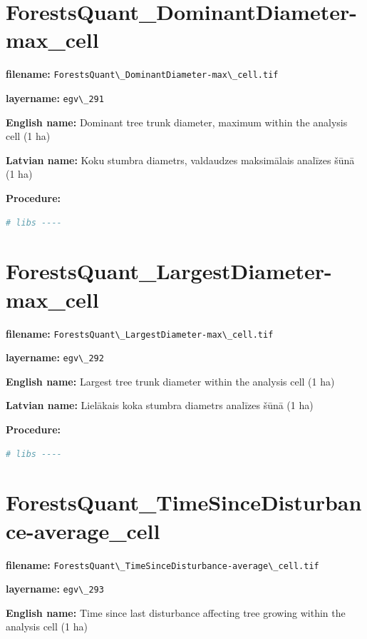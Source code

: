 \documentclass[
]{book}
\newcommand{\passthrough}[1]{#1}
\begin{document}
\section{ForestsQuant\_DominantDiameter-max\_cell}\label{ch06.291}

\textbf{filename:} \passthrough{\lstinline!ForestsQuant\_DominantDiameter-max\_cell.tif!}

\textbf{layername:} \passthrough{\lstinline!egv\_291!}

\textbf{English name:} Dominant tree trunk diameter, maximum within the analysis cell (1 ha)

\textbf{Latvian name:} Koku stumbra diametrs, valdaudzes maksimālais analīzes šūnā (1 ha)

\textbf{Procedure:}

\begin{lstlisting}[language=R]
# libs ----
\end{lstlisting}

\section{ForestsQuant\_LargestDiameter-max\_cell}\label{ch06.292}

\textbf{filename:} \passthrough{\lstinline!ForestsQuant\_LargestDiameter-max\_cell.tif!}

\textbf{layername:} \passthrough{\lstinline!egv\_292!}

\textbf{English name:} Largest tree trunk diameter within the analysis cell (1 ha)

\textbf{Latvian name:} Lielākais koka stumbra diametrs analīzes šūnā (1 ha)

\textbf{Procedure:}

\begin{lstlisting}[language=R]
# libs ----
\end{lstlisting}

\section{ForestsQuant\_TimeSinceDisturbance-average\_cell}\label{ch06.293}

\textbf{filename:} \passthrough{\lstinline!ForestsQuant\_TimeSinceDisturbance-average\_cell.tif!}

\textbf{layername:} \passthrough{\lstinline!egv\_293!}

\textbf{English name:} Time since last disturbance affecting tree growing within the analysis cell (1 ha)
\end{document}

